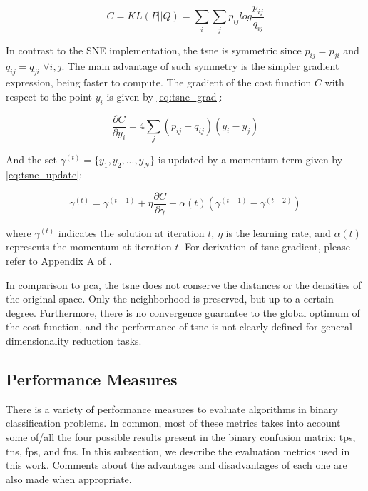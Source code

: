 \begin{equation}
\label{eq:tsne_cost}
C = KL(P||Q) = \sum_i\sum_j p_{ij} log \frac{p_{ij}}{q_{ij}}
\end{equation}

In contrast to the SNE implementation, the \acs{tsne} is symmetric since $p_{ij} = p_{ji}$ and $q_{ij} = q_{ji}$ $\forall i,j$. The main advantage of such symmetry is the simpler gradient expression, being faster to compute. The gradient of the cost function $C$ with respect to the point $y_i$ is given by \autoref{eq:tsne_grad}:

\begin{equation}
\label{eq:tsne_grad}
\frac{\partial C}{\partial y_i} = 4 \sum_j (p_{ij} - q_{ij})(y_i - y_j)
\end{equation}

And the set $\gamma^{(t)} = \{y_1, y_2, ..., y_N\}$ is updated by a momentum term given by \autoref{eq:tsne_update}:

\begin{equation}
\label{eq:tsne_update}
\gamma^{(t)} = \gamma^{(t-1)} + \eta\frac{\partial C}{\partial \gamma} + \alpha(t)(\gamma^{(t-1)} - \gamma^{(t-2)})
\end{equation}

\noindent
where $\gamma^{(t)}$ indicates the solution at iteration $t$, $\eta$ is the learning rate, and $\alpha(t)$ represents the momentum at iteration $t$. For derivation of \acs{tsne} gradient, please refer to Appendix A of \citep{tsne}. 

In comparison to \acs{pca}, the \acs{tsne} does not conserve the distances or the densities of the original space. Only the neighborhood is preserved, but up to a certain degree. Furthermore, there is no convergence guarantee to the global optimum of the cost function, and the performance of \acs{tsne} is not clearly defined for general dimensionality reduction tasks. 


\subsection{Performance Measures} \label{sec:measures}

There is a variety of performance measures to evaluate algorithms in binary classification problems. In common, most of these metrics takes into account some of/all the four possible results present in the binary confusion matrix: \acfp{tp}, \acfp{tn}, \acfp{fp}, and \acfp{fn}. In this subsection, we describe the evaluation metrics used in this work. Comments about the advantages and disadvantages of each one are also made when appropriate. 

